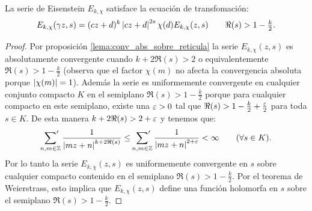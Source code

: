 \documentclass[../../tesis_maestria]{subfiles}
\begin{document}
\begin{prop}
  La serie de Eisenstein $E_{k,\chi}$ satisface la ecuaci\'on de transfomaci\'on:
  \begin{equation}\label{eq:trans_eisenstein_gen}
  E_{k,\chi}(\gamma z,s) =(cz+d)^k\left| cz+d \right|^{2s}\chi(d) E_{k,\chi}(z,s)
\qquad \Re(s)>1-\tfrac{k}{2}.
  \end{equation}
\end{prop}

\begin{proof}
Por proposici\'on \ref{lema:conv_abs_sobre_reticula} la serie $E_{k,\chi}(z,s)$ es absolutamente
convergente cuando $k+2\Re(s)>2$ o equivalentemente $\Re(s)>1-\frac{k}{2}$ (observa que el factor
$\chi(m)$ no afecta la convergencia absoluta porque $\left| \chi(m) \right|=1$). Adem\'as la serie
es uniformemente convergente en cualquier conjunto compacto $K$ en el semiplano $\Re(s)>1-\frac{k}{2}$
porque para cualquier compacto en este semiplano, existe una $\varepsilon>0$ tal que
$\Re(s)>1-\frac{k}{2}+\frac{\varepsilon}{2}$ para toda $s\in K$. De esta manera $k+2\Re(s)>2+\varepsilon$ y
tenemos que:
\[
  \sideset{}{'}\sum_{n,m\in\mathbb{Z}}\frac{1}{\left| mz+n \right|^{k+2\Re(s)}}\leq
  \sideset{}{'}\sum_{n,m\in\mathbb{Z}}\frac{1}{\left| mz+n \right|^{2+\varepsilon}}<\infty \qquad(\forall s\in K).
\]
Por lo tanto la serie $E_{k,\chi}(z,s)$ es uniformemente convergente en $s$ sobre cualquier
compacto contenido en el semiplano $\Re(s)>1-\frac{k}{2}$. Por el teorema de Weierstrass, esto
implica que $E_{k,\chi}(z,s)$ define una funci\'on holomorfa en $s$ sobre el semiplano
$\Re(s)>1-\frac{k}{2}$.


\end{proof}
\end{document}
